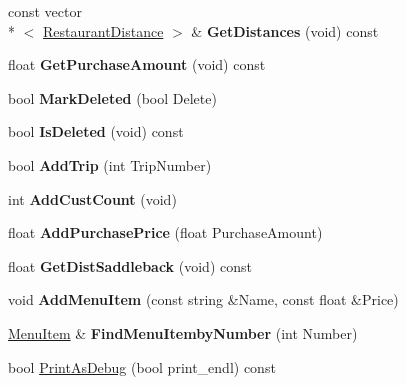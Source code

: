 \begin{DoxyCompactItemize}
\item 
\hypertarget{classRestaurant_aed44cf683bcec3c8d2c5f4f94f4ef936}{const vector\\*
$<$ \hyperlink{structRestaurantDistance}{Restaurant\-Distance} $>$ \& {\bfseries Get\-Distances} (void) const }\label{classRestaurant_aed44cf683bcec3c8d2c5f4f94f4ef936}

\item 
\hypertarget{classRestaurant_aedd3f76ea3d3cb361e9a44abe60e3a76}{float {\bfseries Get\-Purchase\-Amount} (void) const }\label{classRestaurant_aedd3f76ea3d3cb361e9a44abe60e3a76}

\item 
\hypertarget{classRestaurant_a3699a6975dfefc391189710525dbfa3d}{bool {\bfseries Mark\-Deleted} (bool Delete)}\label{classRestaurant_a3699a6975dfefc391189710525dbfa3d}

\item 
\hypertarget{classRestaurant_ad0a20e329cb53d0cf8d994f8dc105949}{bool {\bfseries Is\-Deleted} (void) const }\label{classRestaurant_ad0a20e329cb53d0cf8d994f8dc105949}

\item 
\hypertarget{classRestaurant_aca4ebabbbda736dac400d1ac5c6f0146}{bool {\bfseries Add\-Trip} (int Trip\-Number)}\label{classRestaurant_aca4ebabbbda736dac400d1ac5c6f0146}

\item 
\hypertarget{classRestaurant_a2f0687bea3f4d3ca11a8fdc704fdfa36}{int {\bfseries Add\-Cust\-Count} (void)}\label{classRestaurant_a2f0687bea3f4d3ca11a8fdc704fdfa36}

\item 
\hypertarget{classRestaurant_aa56bf703c6d0c8e03117befeeda61377}{float {\bfseries Add\-Purchase\-Price} (float Purchase\-Amount)}\label{classRestaurant_aa56bf703c6d0c8e03117befeeda61377}

\item 
\hypertarget{classRestaurant_ae67e3528af9514e3bdf01f10db874586}{float {\bfseries Get\-Dist\-Saddleback} (void) const }\label{classRestaurant_ae67e3528af9514e3bdf01f10db874586}

\item 
\hypertarget{classRestaurant_ae709b1c3f23b25dd27c9f526dc536fa8}{void {\bfseries Add\-Menu\-Item} (const string \&Name, const float \&Price)}\label{classRestaurant_ae709b1c3f23b25dd27c9f526dc536fa8}

\item 
\hypertarget{classRestaurant_af483bb828a00f12643e366ecd9766565}{\hyperlink{classMenuItem}{Menu\-Item} \& {\bfseries Find\-Menu\-Itemby\-Number} (int Number)}\label{classRestaurant_af483bb828a00f12643e366ecd9766565}

\item 
bool \hyperlink{classRestaurant_aa303b241946e96f7a4316a30ac6d31df}{Print\-As\-Debug} (bool print\-\_\-endl) const 
\end{DoxyCompactItemize}
